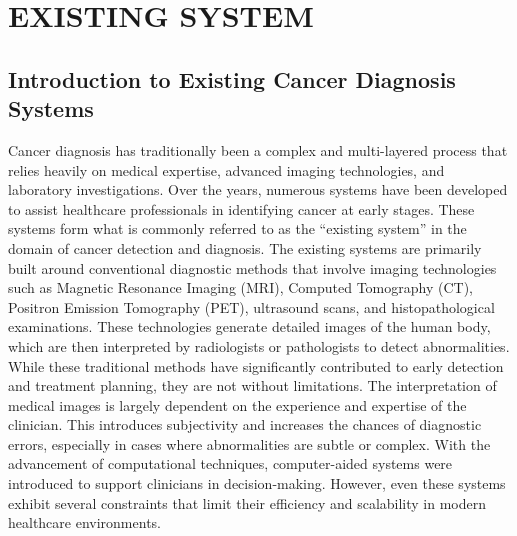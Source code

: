 \documentclass[a4paper,12pt]{report}
\begin{document}
\newpage
{}
\chapter{EXISTING SYSTEM}
\label{chap:lit_survey}
\begin{doublespace}
\section{Introduction to Existing Cancer Diagnosis Systems}
\label{sec:2.1}
Cancer diagnosis has traditionally been a complex and multi-layered process that relies heavily on medical expertise, advanced imaging technologies, and laboratory investigations. Over the years, numerous systems have been developed to assist healthcare professionals in identifying cancer at early stages. These systems form what is commonly referred to as the “existing system” in the domain of cancer detection and diagnosis.
The existing systems are primarily built around conventional diagnostic methods that involve imaging technologies such as Magnetic Resonance Imaging (MRI), Computed Tomography (CT), Positron Emission Tomography (PET), ultrasound scans, and histopathological examinations. These technologies generate detailed images of the human body, which are then interpreted by radiologists or pathologists to detect abnormalities.
While these traditional methods have significantly contributed to early detection and treatment planning, they are not without limitations. The interpretation of medical images is largely dependent on the experience and expertise of the clinician. This introduces subjectivity and increases the chances of diagnostic errors, especially in cases where abnormalities are subtle or complex.
With the advancement of computational techniques, computer-aided systems were introduced to support clinicians in decision-making. However, even these systems exhibit several constraints that limit their efficiency and scalability in modern healthcare environments.


\end{doublespace}
\end{document}
